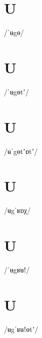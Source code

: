 \documentclass[10pt,a4paper,twoside]{book}
\begin{document}
\section*{U}

\begin{multicols}{3}
 {/ˈʉgɵ/} {}
\end{multicols}

\section*{U}

\begin{multicols}{3}
 {/ˈʉgɵtʼ/} {}
\end{multicols}

\section*{U}

\begin{multicols}{3}
 {/ʉˈgɵtʼɒtʼ/} {}
\end{multicols}

\section*{U}

\begin{multicols}{3}
 {/ʉgˈʁɒχ/} {}
\end{multicols}

\section*{U}

\begin{multicols}{3}
 {/ˈʉgʁʉǃ/} {}
\end{multicols}

\section*{U}

\begin{multicols}{3}
 {/ʉgˈʁʉǃɵtʼ/} {}
\end{multicols}
\end{document}
